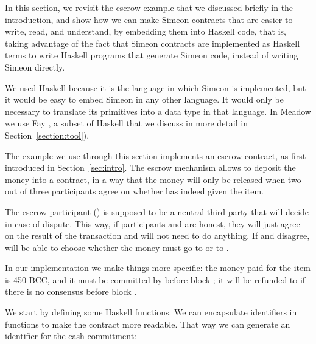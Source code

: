 \documentclass[runningheads]{llncs}
\begin{document}
In this section, we revisit the escrow example that we discussed briefly in the introduction, and show how we can make 
Simeon contracts that are easier to write, read, and understand, by embedding them into Haskell code, that is, taking 
advantage of the fact that Simeon contracts are implemented as Haskell terms to write Haskell programs that generate 
Simeon code, instead of writing Simeon directly.

We used Haskell because it is the language in which Simeon is implemented, but it would be easy to embed Simeon in any 
other language. It would only be necessary to translate its primitives into a data type in that language. In Meadow we 
use Fay \cite{Fay}, a subset of Haskell that we discuss in more detail in Section~\ref{section:tool}).

The example we use through this section implements an escrow contract, as first introduced in Section~\ref{sec:intro}. 
%
%
The escrow mechanism allows  to deposit the money into a contract, in a way that the 
money will only be released when two out of three participants agree on whether  has indeed 
given  the item. 

The escrow participant () is supposed to be a neutral third party that will decide in case of 
dispute. This way, if participants  and  are honest, they will just agree on 
the result of the transaction and  will not need to do anything. If  and 
 disagree,  will be able to choose whether the money must go to 
 or to .

In our implementation we make things more specific: the money paid for the item is 450 BCC, and it must be committed by 
 before block ; it will be refunded to  if 
there is no consensus before block .

We start by defining some Haskell functions. We can encapsulate identifiers in functions to make the contract more 
readable. That way we can generate an identifier for the cash commitment:
\end{document}
